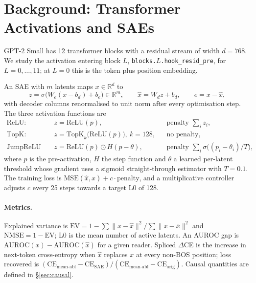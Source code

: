 \section{Background: Transformer Activations and SAEs}\label{sec:background}

GPT-2 Small has 12 transformer blocks with a residual stream of width $d=768$. We study the activation entering block
$L$, \texttt{blocks.$L$.hook\_resid\_pre}, for $L=0,\dots,11$; at $L=0$ this is the token plus position embedding.

An SAE with $m$ latents maps $x\in\mathbb{R}^d$ to
\begin{equation}
  z=\sigma\big(W_e(x-b_d)+b_e\big)\in\mathbb{R}^m,\qquad \hat{x}=W_d z+b_d,\qquad e=x-\hat{x},
\end{equation}
with decoder columns renormalised to unit norm after every optimisation step. The three activation functions are
\begin{align}
  \text{ReLU:}\quad & z=\mathrm{ReLU}(p), && \text{penalty } \textstyle\sum_i z_i,\\
  \text{TopK:}\quad & z=\mathrm{TopK}_k\big(\mathrm{ReLU}(p)\big),\ k=128, && \text{no penalty},\\
  \text{JumpReLU (surrogate):}\quad & z=\mathrm{ReLU}(p)\odot H(p-\theta), && \text{penalty } \textstyle\sum_i \sigma\big((p_i-\theta_i)/T\big),
\end{align}
where $p$ is the pre-activation, $H$ the step function and $\theta$ a learned per-latent threshold whose gradient uses
a sigmoid straight-through estimator with $T=0.1$. The training loss is $\mathrm{MSE}(\hat{x},x)+c\cdot\text{penalty}$,
and a multiplicative controller adjusts $c$ every 25 steps towards a target L0 of 128.

\paragraph{Metrics.} Explained variance is $\mathrm{EV}=1-\sum\|x-\hat{x}\|^2/\sum\|x-\bar{x}\|^2$ and
$\mathrm{NMSE}=1-\mathrm{EV}$; L0 is the mean number of active latents. An AUROC gap is
$\mathrm{AUROC}(x)-\mathrm{AUROC}(\hat{x})$ for a given reader. Spliced $\Delta$CE is the increase in next-token
cross-entropy when $\hat{x}$ replaces $x$ at every non-BOS position; loss recovered is
$(\mathrm{CE}_{\text{mean-abl}}-\mathrm{CE}_{\text{SAE}})/(\mathrm{CE}_{\text{mean-abl}}-\mathrm{CE}_{\text{orig}})$.
Causal quantities are defined in \S\ref{sec:causal}.

